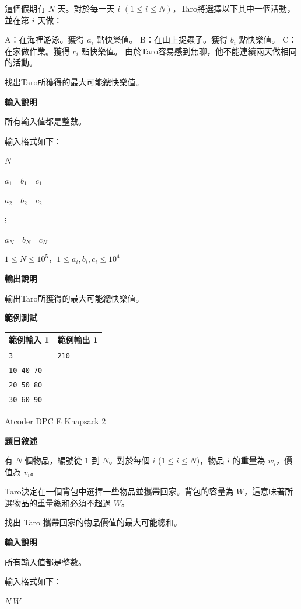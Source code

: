     這個假期有 $N$ 天。對於每一天 $i$ $(1 \le i \le N)$，Taro將選擇以下其中一個活動，並在第 $i$ 天做：

    A：在海裡游泳。獲得 $a_i$ 點快樂值。
    B：在山上捉蟲子。獲得 $b_i$ 點快樂值。
    C：在家做作業。獲得 $c_i$ 點快樂值。
    由於Taro容易感到無聊，他不能連續兩天做相同的活動。

    找出Taro所獲得的最大可能總快樂值。

    \textbf{輸入說明}

    所有輸入值都是整數。

    輸入格式如下：

    $N$

    $a_1 \quad b_1 \quad c_1$

    $a_2 \quad b_2 \quad c_2$

    $\vdots$

    $a_N \quad b_N \quad c_N$

    $1 \le N \le 10^5$，$1 \le a_i, b_i, c_i \le 10^4$

    \textbf{輸出說明}

    輸出Taro所獲得的最大可能總快樂值。

    \textbf{範例測試}

    \begin{tabular}{|m{7cm}|m{7cm}|}
        \hline
        範例輸入 1 & 範例輸出 1 \\
        \hline
        \verb|3| & \verb|210| \\
        \verb|10 40 70| & \\
        \verb|20 50 80| & \\
        \verb|30 60 90| & \\
        \hline
    \end{tabular}

    \problem Atcoder DPC E Knapsack 2

    \textbf{題目敘述}

    有 $N$ 個物品，編號從 $1$ 到 $N$。對於每個 $i$ ($1 \le i \le N$)，物品 $i$ 的重量為 $w_i$，價值為 $v_i$。

    Taro決定在一個背包中選擇一些物品並攜帶回家。背包的容量為 $W$，這意味著所選物品的重量總和必須不超過 $W$。

    找出 Taro 攜帶回家的物品價值的最大可能總和。

    \textbf{輸入說明}

    所有輸入值都是整數。

    輸入格式如下：

    $N\ W$

